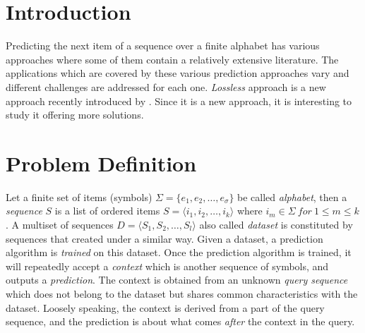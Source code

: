 \begin{comment}
							

\end{comment}

\section{Introduction}
Predicting the next item of a sequence over a finite alphabet has various approaches where some of them contain a relatively extensive literature. The applications which are covered by these various prediction approaches vary and different challenges are addressed for each one. \emph{Lossless} approach is a new approach  recently introduced by \citeauthor{gueniche_fournier-viger_tseng_2013} \citeyear{gueniche_fournier-viger_tseng_2013}. Since it is a new approach, it is interesting to study it offering more solutions.
\section{Problem Definition}
Let a finite set of items (symbols) \(\Sigma = \{e_1, e_2,\ldots,e_\sigma\}\) be called \emph{alphabet}, then a \emph{sequence} \(S\) is a list of ordered items \(S=\langle i_1,i_2,\ldots,i_k\rangle\) where \(i_m \in \Sigma\ for\ 1\leq m \leq k\). A multiset of sequences \(D = \langle S_1, S_2,\ldots,S_l\rangle\) also called \emph{dataset} is constituted by sequences that created under a similar way. Given a dataset, a prediction algorithm is \emph{trained} on this dataset.  Once the prediction algorithm is trained, it will repeatedly accept a \emph{context} which is another sequence of symbols, and outputs a \emph{prediction}. The context is obtained from an unknown \emph{query sequence} which does not belong to the dataset but shares common characteristics with the dataset.  Loosely speaking, the context is derived from a part of the query sequence, and the prediction is about what comes \emph{after} the context in the query.

